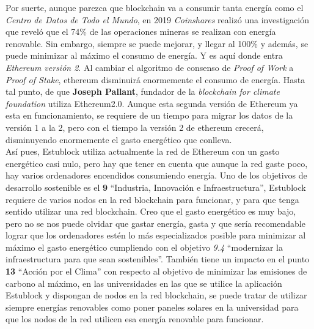 \clearpage
Por suerte, aunque parezca que blockchain va a consumir tanta energía como el \textit{Centro de Datos de Todo el Mundo}, en 2019 \emph{Coinshares} realizó una investigación\cite{coinshare} que reveló que el 74\% de las operaciones mineras se realizan con energía renovable. Sin embargo, siempre se puede mejorar, y llegar al 100\% y además, se puede minimizar al máximo el consumo de energía. Y es aquí donde entra \emph{Ethereum versión 2}\cite{Ethereum2.0}. Al cambiar el algoritmo de consenso de \textit{Proof of Work} a \textit{Proof of Stake}, ethereum disminuirá enormemente el consumo de energía. Hasta tal punto, de que \textbf{Joseph Pallant}, fundador de la \emph{blockchain for climate foundation}\cite{bkClimateF} utiliza Ethereum2.0. Aunque esta segunda versión de Ethereum ya esta en funcionamiento, se requiere de un tiempo para migrar los datos de la versión 1 a la 2, pero con el tiempo la versión 2 de ethereum crecerá, disminuyendo enormemente el gasto energético que conlleva. \\

Así pues, Estublock utiliza actualmente la red de Ethereum con un gasto energético casi nulo, pero hay que tener en cuenta que aunque la red gaste poco, hay varios ordenadores encendidos consumiendo energía. Uno de los objetivos de desarrollo sostenible es el \textbf{9} ``Industria, Innovación e Infraestructura'', Estublock requiere de varios nodos en la red blockchain para funcionar, y para que tenga sentido utilizar una red blockchain. Creo que el gasto energético es muy bajo, pero no se nos puede olvidar que gastar energía, gasta y que sería recomendable lograr que los ordenadores estén lo más especializados posible para minimizar al máximo el gasto energético cumpliendo con el objetivo \textit{9.4} ``modernizar la infraestructura para que sean sostenibles''. También tiene un impacto en el punto \textbf{13} ``Acción por el Clima'' con respecto al objetivo de minimizar las emisiones de carbono al máximo, en las universidades en las que se utilice la aplicación Estublock y dispongan de nodos en la red blockchain, se puede tratar de utilizar siempre energías renovables como poner paneles solares en la universidad para que los nodos de la red utilicen esa energía renovable para funcionar.

